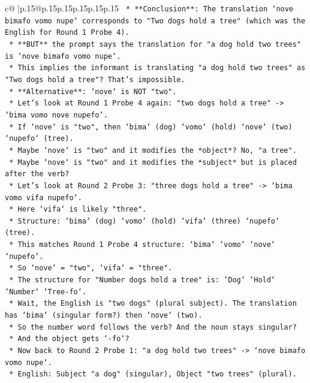 \documentclass{article}
\begin{document}
{\begin{supertabular}{c@{$\;$}|p{.15\linewidth}@{}p{.15\linewidth}p{.15\linewidth}p{.15\linewidth}p{.15\linewidth}p{.15\linewidth}}
{{{\texttt{            *   **Conclusion**: The translation `nove bimafo vomo nupe` corresponds to "Two dogs hold a tree" (which was the English for Round 1 Probe 4).} \\
\texttt{            *   **BUT** the prompt says the translation for "a dog hold two trees" is `nove bimafo vomo nupe`.} \\
\texttt{            *   This implies the informant is translating "a dog hold two trees" as "Two dogs hold a tree"? That's impossible.} \\
\texttt{            *   **Alternative**: `nove` is NOT "two".} \\
\texttt{            *   Let's look at Round 1 Probe 4 again: "two dogs hold a tree" {-}> `bima vomo nove nupefo`.} \\
\texttt{            *   If `nove` is "two", then `bima` (dog) `vomo` (hold) `nove` (two) `nupefo` (tree).} \\
\texttt{            *   Maybe `nove` is "two" and it modifies the *object*? No, "a tree".} \\
\texttt{            *   Maybe `nove` is "two" and it modifies the *subject* but is placed after the verb?} \\
\texttt{            *   Let's look at Round 2 Probe 3: "three dogs hold a tree" {-}> `bima vomo vifa nupefo`.} \\
\texttt{            *   Here `vifa` is likely "three".} \\
\texttt{            *   Structure: `bima` (dog) `vomo` (hold) `vifa` (three) `nupefo` (tree).} \\
\texttt{            *   This matches Round 1 Probe 4 structure: `bima` `vomo` `nove` `nupefo`.} \\
\texttt{            *   So `nove` = "two", `vifa` = "three".} \\
\texttt{            *   The structure for "Number dogs hold a tree" is: `Dog` `Hold` `Number` `Tree{-}fo`.} \\
\texttt{            *   Wait, the English is "two dogs" (plural subject). The translation has `bima` (singular form?) then `nove` (two).} \\
\texttt{            *   So the number word follows the verb? And the noun stays singular?} \\
\texttt{            *   And the object gets `{-}fo`?} \\
\texttt{            *   Now back to Round 2 Probe 1: "a dog hold two trees" {-}> `nove bimafo vomo nupe`.} \\
\texttt{            *   English: Subject "a dog" (singular), Object "two trees" (plural).} \\
}}}
\end{supertabular}}
\end{document}
